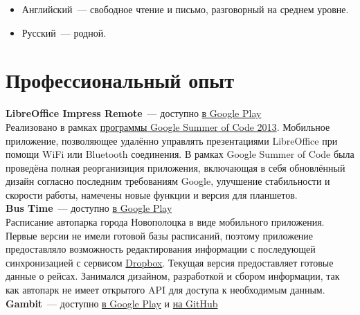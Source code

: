     \begin{itemize}

      \item Английский~--- свободное чтение и письмо, разговорный на среднем уровне.

      \item Русский~--- родной.

    \end{itemize}


  \section*{Профессиональный опыт}

      \textbf{LibreOffice Impress Remote}~--- доступно \href{https://play.google.com/store/apps/details?id=org.libreoffice.impressremote}{в Google Play} \\

        Реализовано в рамках \href{https://developers.google.com/open-source/soc}{программы Google Summer of Code 2013}.
        Мобильное приложение, позволяющее удалённо управлять презентациями
        LibreOffice при помощи WiFi или Bluetooth соединения. В рамках
        Google Summer of Code была проведёна полная реорганизиция приложения,
        включающая в себя обновлённый дизайн согласно последним требованиям
        Google, улучшение стабильности и скорости работы, намечены новые
        функции и версия для планшетов. \\

      \textbf{Bus Time}~--- доступно \href{https://play.google.com/store/apps/details?id=ru.ming13.bustime}{в Google Play} \\

        Расписание автопарка города Новополоцка в виде мобильного приложения.
        Первые версии не имели готовой базы расписаний, поэтому приложение
        предоставляло возможность редактирования информации с последующей синхронизацией
        с сервисом \href{https://dropbox.com}{Dropbox}. Текущая версия
        предоставляет готовые данные о рейсах. Занимался дизайном, разработкой
        и сбором информации, так как автопарк не имеет открытого API для доступа
        к необходимым данным. \\

      \textbf{Gambit}~--- доступно \href{https://play.google.com/store/apps/details?id=ru.ming13.gambit}{в Google Play}
        и \href{https://github.com/ming13/gambit}{на GitHub} \\

